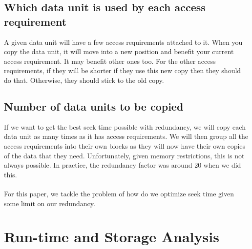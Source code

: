 \documentclass[11pt,psfig]{article}
\begin{document}
\subsection*{Which data unit is used by each access requirement}

A given data unit will have a few access requirements attached to it. When you copy the data unit, it will move into a new position and benefit your current access requirement. It may benefit other ones too. For the other access requirements, if they will be shorter if they use this new copy then they should do that. Otherwise, they should stick to the old copy. 

\subsection*{Number of data units to be copied} 

If we want to get the best seek time possible with redundancy, we will copy each data unit as many times as it has access requirements. We will then group all the access requirements into their own blocks as they will now have their own copies of the data that they need. Unfortunately, given memory restrictions, this is not always possible. In practice, the redundancy factor was around 20 when we did this. \\
\\
For this paper, we tackle the problem of how do we optimize seek time given some limit on our redundancy. 

\section*{Run-time and Storage Analysis}
\end{document}
